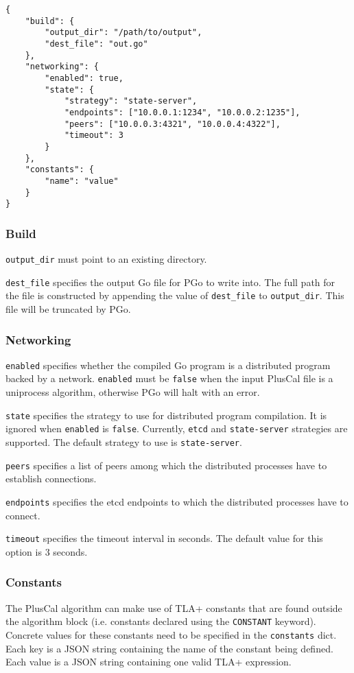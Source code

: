 \begin{lstlisting}
{
	"build": {
		"output_dir": "/path/to/output",
		"dest_file": "out.go"
	},
	"networking": {
		"enabled": true,
		"state": {
			"strategy": "state-server",
			"endpoints": ["10.0.0.1:1234", "10.0.0.2:1235"],
			"peers": ["10.0.0.3:4321", "10.0.0.4:4322"],
			"timeout": 3
		}
	},
	"constants": {
		"name": "value"
	}
}
\end{lstlisting}

\subsubsection{Build}
\noindent\lstinline|output_dir| must point to an existing directory.

\noindent\lstinline|dest_file| specifies the output Go file for PGo to write into. The full path for the file is constructed by appending the value of \lstinline|dest_file| to \lstinline|output_dir|. This file will be truncated by PGo.
\subsubsection{Networking}
\noindent\lstinline|enabled| specifies whether the compiled Go program is a distributed program backed by a network. \lstinline|enabled| must be \lstinline|false| when the input PlusCal file is a uniprocess algorithm, otherwise PGo will halt with an error.

\noindent\lstinline|state| specifies the strategy to use for distributed program compilation. It is ignored when \lstinline|enabled| is \lstinline|false|. Currently, \lstinline|etcd| and \lstinline|state-server| strategies are supported. The default strategy to use is \lstinline|state-server|.

\noindent\lstinline|peers| specifies a list of peers among which the distributed processes have to establish connections.

\noindent\lstinline|endpoints| specifies the etcd endpoints to which the distributed processes have to connect.

\noindent\lstinline|timeout| specifies the timeout interval in seconds. The default value for this option is 3 seconds.
\subsubsection{Constants}
The PlusCal algorithm can make use of TLA+ constants that are found outside the algorithm block (i.e. constants declared using the \lstinline[language=pcal]|CONSTANT| keyword). Concrete values for these constants need to be specified in the \lstinline|constants| dict. Each key is a JSON string containing the name of the constant being defined. Each value is a JSON string containing one valid TLA+ expression.

